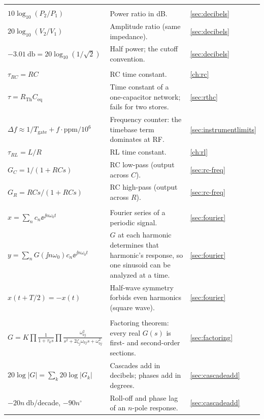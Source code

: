 \begin{longtable}{@{}L{0.31\textwidth}L{0.47\textwidth}L{0.14\textwidth}@{}}
\addlinespace
{}\\
\(10\log_{10}(P_2/P_1)\) & Power ratio in dB. & \cref{sec:decibels} \\
\(20\log_{10}(V_2/V_1)\) & Amplitude ratio (same impedance). & \cref{sec:decibels} \\
\(-\SI{3.01}{\decibel}=20\log_{10}(1/\sqrt2)\) & Half power; the cutoff convention. & \cref{sec:decibels} \\
\addlinespace
{}\\
\(\tau_{RC}=RC\) & RC time constant. & \cref{ch:rc} \\
\(\tau=R_{\mathrm{Th}}C_{\mathrm{eq}}\) & Time constant of a one-capacitor network; fails for two stores. & \cref{sec:rthc} \\
\(\Delta f\approx1/T_{\mathrm{gate}}+f\cdot\mathrm{ppm}/10^6\) & Frequency counter: the timebase term dominates at RF. & \cref{sec:instrumentlimits} \\
\(\tau_{RL}=L/R\) & RL time constant. & \cref{ch:rl} \\
\(G_C=1/(1+RCs)\) & RC low-pass (output across \(C\)). & \cref{sec:rc-freq} \\
\(G_R=RCs/(1+RCs)\) & RC high-pass (output across \(R\)). & \cref{sec:rc-freq} \\
\addlinespace
{}\\
\(x=\sum_n c_n\ee^{\jj n\omega_0t}\) & Fourier series of a periodic signal. & \cref{sec:fourier} \\
\(y=\sum_n G(\jj n\omega_0)c_n\ee^{\jj n\omega_0 t}\) & \(G\) at each harmonic determines that harmonic's response, so one sinusoid can be analyzed at a time. & \cref{sec:fourier} \\
\(x(t+T/2)=-x(t)\) & Half-wave symmetry forbids even harmonics (square wave). & \cref{sec:fourier} \\
\addlinespace
{}\\
\(G=K\prod\frac{1}{1+\tau_ks}\prod\frac{\omega_{0j}^2}{s^2+2\zeta_j\omega_{0j}s+\omega_{0j}^2}\) & Factoring theorem: every real \(G(s)\) is first- and second-order sections. & \cref{sec:factoring} \\
\(20\log|G|=\sum_k 20\log|G_k|\) & Cascades add in decibels; phases add in degrees. & \cref{sec:cascadeadd} \\
\(-20n\ \si{\decibel}\)/decade, \(-90n^\circ\) & Roll-off and phase lag of an \(n\)-pole response. & \cref{sec:cascadeadd} \\

\end{longtable}
